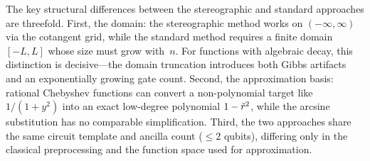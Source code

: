 The key structural differences between the stereographic and
standard approaches are threefold.  First, the domain: the
stereographic method works on $(-\infty,\infty)$ via the
cotangent grid, while the standard method requires a finite
domain $[-L,L]$ whose size must grow with~$n$.  For functions
with algebraic decay, this distinction is decisive---the domain
truncation introduces both Gibbs artifacts and an exponentially
growing gate count.  Second, the approximation basis: rational
Chebyshev functions can convert a non-polynomial target like
$1/(1+y^2)$ into an exact low-degree polynomial
$1 - \tilde{r}^2$, while the arcsine substitution has no
comparable simplification.  Third, the two approaches share the
same circuit template and ancilla count ($\leq 2$ qubits),
differing only in the classical preprocessing and the function
space used for approximation.

